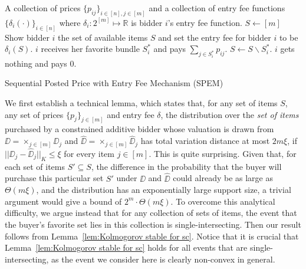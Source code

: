\begin{algorithm}[ht]
\begin{algorithmic}[1]
\REQUIRE A collection of prices $\{p_{ij}\}_{i\in[n], j\in[m]}$ and a collection of entry fee functions $\{\delta_i(\cdot)\}_{i\in[n]}$ where $\delta_i: 2^{[m]}\mapsto \mathbb{R}$ is bidder $i$'s entry fee function.
\STATE $S\gets [m]$
	\STATE Show bidder $i$ {the} set of available items $S$ and set the entry fee for bidder $i$ to be ${\delta_i}(S)$.
        \STATE $i$ receives her favorite bundle $S_i^{*}$ and pays $\sum_{j\in S_i^{*}}p_{ij}$.
        \STATE $S\gets S\backslash S_i^{*}$.
    \ELSE
        \STATE $i$ gets nothing and pays $0$.
    \ENDIF
\ENDFOR
\end{algorithmic}
\caption{{\sf Sequential Posted Price with Entry Fee Mechanism (SPEM)}}
\label{alg:spem-mech}
\end{algorithm} 


 We first establish a technical lemma, which states that, for any set of items $S$, any set of prices $\{p_j\}_{j\in [m]}$ and entry fee $\delta$, the distribution over the {\em set of items} purchased by a constrained additive bidder whose valuation is drawn from  $\DD=\times_{j\in[m]} \DD_j$ and $\hat{\DD}=\times_{j\in[m]} \hat{\DD}_j$ has total variation distance at most $2m\xi$, if $||\DD_j-\hat{\DD}_j||_K\leq \xi$ for every item $j\in [m]$. This is quite surprising. Given that, for each set of items $S' \subseteq S$, the difference in the probability that the buyer will purchase this particular set $S'$ under $\DD$ and $\hat{\DD}$ could already be as large as {$\Theta(m\xi)$}, and the distribution has an exponentially large support size,  a trivial argument would give a bound of {$2^m\cdot \Theta(m\xi)$}. To overcome this analytical difficulty, we argue instead that for any collection of sets of items, the event that the buyer's favorite set lies in this collection is single-intersecting. Then our result follows from Lemma~\ref{lem:Kolmogorov stable for sc}. Notice that it is crucial that Lemma~\ref{lem:Kolmogorov stable for sc} holds for all events that are single-intersecting, as the event we consider here is clearly non-convex in general. 


